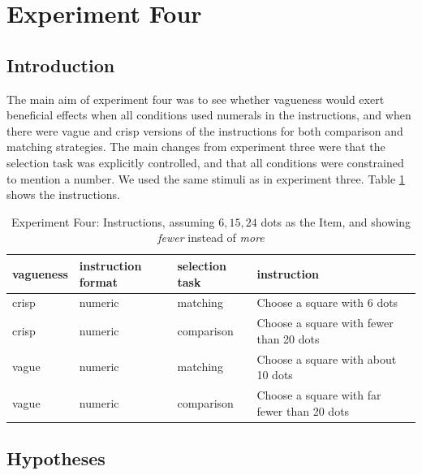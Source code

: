 \documentclass[doc,apacite]{apa6}
\begin{document}
\section{Experiment Four}

\subsection{Introduction}

The main aim of experiment four was to see whether vagueness would exert beneficial effects when all conditions used numerals in the instructions, and when there were vague and crisp versions of the instructions for both comparison and matching strategies. The main changes from experiment three were that the selection task was explicitly controlled, and that all conditions were constrained to mention a number. We used the same stimuli as in experiment three. Table \ref{Instructions for e4} shows the instructions. %

\begin{table}[htbp]
\centering
\caption{Experiment Four: Instructions, assuming $6,15,24$ dots as the Item, and showing \emph{fewer} instead of \emph{more}}
\label{Instructions for e4}
\begin{tabular}{llll}
\hline
vagueness&instruction format&selection task&instruction\\
\hline
crisp & numeric&matching & Choose a square with 6 dots \\ 
crisp & numeric&comparison & Choose a square with fewer than 20 dots \\
vague & numeric&matching & Choose a square with about 10 dots \\ 
vague & numeric&comparison & Choose a square with far fewer than 20 dots \\ 
\hline
\end{tabular}
\end{table}%


\subsection{Hypotheses}
\end{document}
